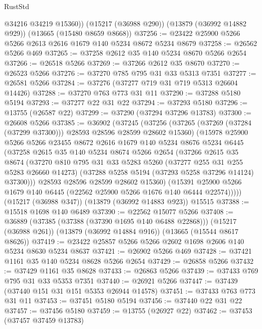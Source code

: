\begin{lexlean}{RustStd}
\begin{coremodule}
        @34216
        @34219
        @15360))
    (@15217 (@36988 @290))
    (@13879 (@36992 @14882 @929))
    (@13665 (@15480 @8659 @8668))
@37256 := @23422 @25900 @5266 @5266 @2613 @2616 @1679 @140 @5234 @8672 @5234 @8679
@37258 := @26562 @5266 @469
@37265 := @37258 @2612 @35 @140 @5234 @8670 @5266 @2654
@37266 := @26518 @5266
@37269 := @37266 @2612 @35 @8670
@37270 := @26523 @5266
@37276 := @37270 @785 @795 @31 @33 @5313 @7351
@37277 := @26581 @5266
@37284 := @37276 (@37277 @719 @31 @719 @5313 @26604 @14426)
@37288 := @37270 @763 @773 @31 @11
@37290 := @37288 @5180 @5194
@37293 := @37277 @22 @31 @22
@37294 := @37293 @5180
@37296 := @13755 (@26587 @22)
@37299 := @37290 (@37294 @37296 @13783)
@37300 := @26608 @5266
@37385 := @36902
    (@37245
      (@37256
        (@37265 (@37269 (@37284 (@37299 @37300))) @28593 @28596 @28599 @28602 @15360)
        (@15978
          @25900
          @5266
          @5266
          @23455
          @8672
          @2616
          @1679
          @140
          @5234
          @8676
          @5234
          @6445
          (@37258
            @2615
            @35
            @140
            @5234
            @8674
            @5266
            @2654
            (@37266
              @2615
              @35
              @8674
              (@37270
                @810
                @795
                @31
                @33
                @5283
                @5260
                (@37277 @255 @31 @255 @5283 @26660 @14273)
                (@37288 @5258 @5194 (@37293 @5258 @37296 @14124) @37300)))
            @28593
            @28596
            @28599
            @28602
            @15360)
          (@15391 @25900 @5266 @1679 @140 @6445 (@22562 @25900 @5266 @1676 @140 @6444 @22574)))))
    (@15217 (@36988 @347))
    (@13879 (@36992 @14883 @923))
    @15515
@37388 := @15518 @1698 @140 @6489
@37390 := @22562 @15077 @5266
@37408 := @36889
    (@37385 (@37388 (@37390 @1695 @140 @6488 @22868)))
    (@15217 (@36988 @261))
    (@13879 (@36992 @14884 @916))
    (@13665 (@15544 @8617 @8626))
@37419 := @23422 @25857 @5266 @5266 @2602 @1698 @2606 @140 @5234 @8630 @5234 @8637
@37421 := @26902 @5266 @469
@37428 := @37421 @1161 @35 @140 @5234 @8628 @5266 @2654
@37429 := @26858 @5266
@37432 := @37429 @1161 @35 @8628
@37433 := @26863 @5266
@37439 := @37433 @769 @795 @31 @33 @5353 @7351
@37440 := @26921 @5266
@37447 := @37439 (@37440 @151 @31 @151 @5353 @26944 @14578)
@37451 := @37433 @763 @773 @31 @11
@37453 := @37451 @5180 @5194
@37456 := @37440 @22 @31 @22
@37457 := @37456 @5180
@37459 := @13755 (@26927 @22)
@37462 := @37453 (@37457 @37459 @13783)

\end{coremodule}
\end{lexlean}
